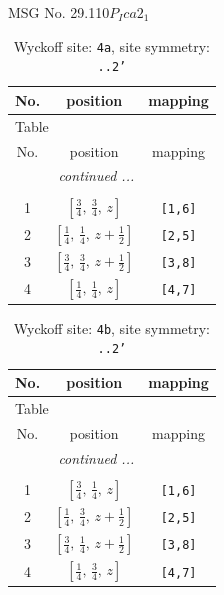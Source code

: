 \documentclass[fleqn,8pt]{jsarticle}
\begin{document}
\setcounter{MaxMatrixCols}{32}

\renewcommand{\tablename}{Table~}
\renewcommand{\figurename}{Figure~}
\begin{center}
\LARGE
MSG No. 29.110\quad$P_{I}ca2_{1}$
\end{center}
\renewcommand{\arraystretch}{1.2}
\begin{longtable}{ccc}
\caption{Wyckoff site: {\tt 4a}, site symmetry: {\tt ..2'}}
 \\
 \hline \hline
No. & position & mapping \\ \hline \endfirsthead

\multicolumn{2}{l}{\tablename\ \thetable{}} \\
 \hline \hline
No. & position & mapping \\ \hline \endhead

 \hline \hline
\multicolumn{2}{r}{\footnotesize\it continued ...} \\ \endfoot

 \hline \hline
\multicolumn{2}{r}{} \\ \endlastfoot

1 & $\left[ \frac{3}{4},\, \frac{3}{4},\, z \right]$ & {\tt [1,6]} \\ \hline
2 & $\left[ \frac{1}{4},\, \frac{1}{4},\, z + \frac{1}{2} \right]$ & {\tt [2,5]} \\ \hline
3 & $\left[ \frac{3}{4},\, \frac{3}{4},\, z + \frac{1}{2} \right]$ & {\tt [3,8]} \\ \hline
4 & $\left[ \frac{1}{4},\, \frac{1}{4},\, z \right]$ & {\tt [4,7]} \\
\end{longtable}
\renewcommand{\arraystretch}{1.2}
\begin{longtable}{ccc}
\caption{Wyckoff site: {\tt 4b}, site symmetry: {\tt ..2'}}
 \\
 \hline \hline
No. & position & mapping \\ \hline \endfirsthead

\multicolumn{2}{l}{\tablename\ \thetable{}} \\
 \hline \hline
No. & position & mapping \\ \hline \endhead

 \hline \hline
\multicolumn{2}{r}{\footnotesize\it continued ...} \\ \endfoot

 \hline \hline
\multicolumn{2}{r}{} \\ \endlastfoot

1 & $\left[ \frac{3}{4},\, \frac{1}{4},\, z \right]$ & {\tt [1,6]} \\ \hline
2 & $\left[ \frac{1}{4},\, \frac{3}{4},\, z + \frac{1}{2} \right]$ & {\tt [2,5]} \\ \hline
3 & $\left[ \frac{3}{4},\, \frac{1}{4},\, z + \frac{1}{2} \right]$ & {\tt [3,8]} \\ \hline
4 & $\left[ \frac{1}{4},\, \frac{3}{4},\, z \right]$ & {\tt [4,7]} \\
\end{longtable}
\end{document}
